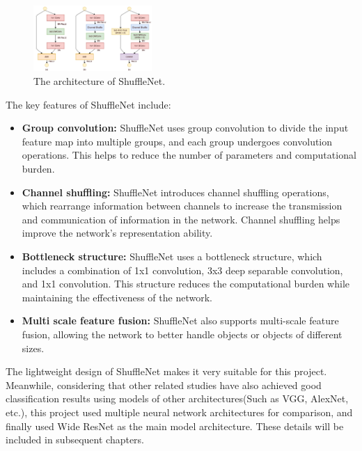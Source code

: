 \documentclass[twocolumn]{article}
\begin{document}
        \begin{figure}[h]
            \centering
            \includegraphics[width=0.4\textwidth]{shuffle_net.png}
            \caption{The architecture of ShuffleNet.}
            \label{shuffle_net}
        \end{figure}

        The key features of ShuffleNet include\cite{zhang2017shufflenet}:

        \begin{itemize}
        \item \textbf{Group convolution:} ShuffleNet uses group convolution to divide the input feature map into multiple groups, and each group undergoes convolution operations. This helps to reduce the number of parameters and computational burden.
        \item \textbf{Channel shuffling:} ShuffleNet introduces channel shuffling operations, which rearrange information between channels to increase the transmission and communication of information in the network. Channel shuffling helps improve the network's representation ability.
        \item \textbf{Bottleneck structure:} ShuffleNet uses a bottleneck structure, which includes a combination of 1x1 convolution, 3x3 deep separable convolution, and 1x1 convolution. This structure reduces the computational burden while maintaining the effectiveness of the network.
        \item \textbf{Multi scale feature fusion:} ShuffleNet also supports multi-scale feature fusion, allowing the network to better handle objects or objects of different sizes\cite{shufflenet2}.
        \end{itemize}

        The lightweight design of ShuffleNet\cite{MOUSSA1991283} makes it very suitable for this project. Meanwhile, considering that other related studies have also achieved good classification results using models of other architectures(Such as VGG, AlexNet, etc.), this project used multiple neural network architectures for comparison, and finally used Wide ResNet as the main model architecture. These details will be included in subsequent chapters.
        
\end{document}
